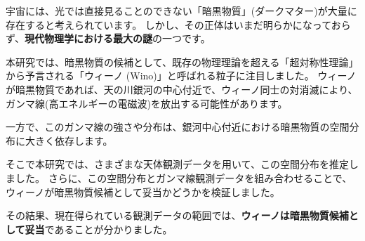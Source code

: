 宇宙には、光では直接見ることのできない「暗黒物質」(ダークマター)が大量に存在すると考えられています。
しかし、その正体はいまだ明らかになっておらず、\textbf{現代物理学における最大の謎}の一つです。

本研究では、暗黒物質の候補として、既存の物理理論を超える「超対称性理論」から予言される「ウィーノ (Wino)」と呼ばれる粒子に注目しました。
ウィーノが暗黒物質であれば、天の川銀河の中心付近で、ウィーノ同士の対消滅により、ガンマ線(高エネルギーの電磁波)を放出する可能性があります。

一方で、このガンマ線の強さや分布は、銀河中心付近における暗黒物質の空間分布に大きく依存します。

そこで本研究では、さまざまな天体観測データを用いて、この空間分布を推定しました。
さらに、この空間分布とガンマ線観測データを組み合わせることで、ウィーノが暗黒物質候補として妥当かどうかを検証しました。

その結果、現在得られている観測データの範囲では、\textbf{ウィーノは暗黒物質候補として妥当}であることが分かりました。
